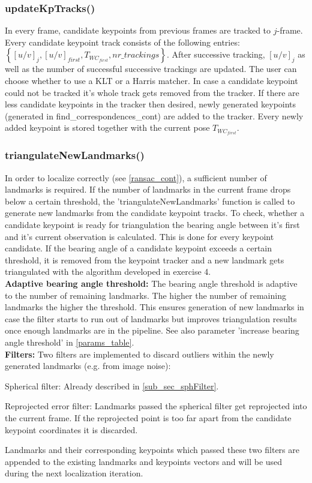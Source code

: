 \subsubsection{updateKpTracks()}
In every frame, candidate keypoints from previous frames are tracked to $j$-frame. Every candidate keypoint track consists of the following entries: $\left\{\left[u/v\right]_j, \left[u/v\right]_{first}, T_{WC_{first}}, nr\_trackings\right\}$. After successive tracking, $[u/v]_j$ as well as the number of successful successive trackings are updated. The user can choose whether to use a KLT or a Harris matcher.
In case a candidate keypoint could not be tracked it's whole track gets removed from the tracker. If there are less candidate keypoints in the tracker then desired, newly generated keypoints (generated in find\_correspondences\_cont) are added to the tracker. Every newly added keypoint is stored together with the current pose $T_{WC_{first}}$.

\subsubsection{triangulateNewLandmarks()}
\label{triang_cont}
In order to localize correctly (see \cref{ransac_cont}), a sufficient number of landmarks is required. If the number of landmarks in the current frame drops below a certain threshold, the 'triangulateNewLandmarks' function is called to generate new landmarks from the candidate keypoint tracks. To check, whether a candidate keypoint is ready for triangulation the bearing angle between it's first and it's current observation is calculated. This is done for every keypoint candidate. If the bearing angle of a candidate keypoint exceeds a certain threshold, it is removed from the keypoint tracker and a new landmark gets triangulated with the algorithm developed in exercise 4.\\
\textbf{Adaptive bearing angle threshold: }The bearing angle threshold is adaptive to the number of remaining landmarks. The higher the number of remaining landmarks the higher the threshold. This ensures generation of new landmarks in case the filter starts to run out of landmarks but improves triangulation results once enough landmarks are in the pipeline. See also parameter 'increase bearing angle threshold' in \cref{params_table}.\\
\textbf{Filters:} Two filters are implemented to discard outliers within the newly generated landmarks (e.g. from image noise):
\begin{compactenum}
	\item Spherical filter: Already described in \cref{sub_sec_sphFilter}.
	\item Reprojected error filter: Landmarks passed the spherical filter get reprojected into the current frame. If the reprojected point is too far apart from the candidate keypoint coordinates it is discarded.
\end{compactenum}
Landmarks and their corresponding keypoints which passed these two filters are appended to the existing landmarks and keypoints vectors and will be used during the next localization iteration.

